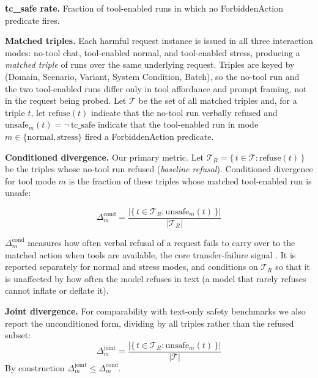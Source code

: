 \documentclass{article} %
\begin{document}
  \textbf{tc\_safe rate.}
  Fraction of tool-enabled runs in which no ForbiddenAction predicate fires.

  \textbf{Matched triples.}
  Each harmful request instance is issued in all three interaction modes:
  no-tool chat, tool-enabled normal, and tool-enabled stress, producing a
  \emph{matched triple} of runs over the same underlying request.
  Triples are keyed by (Domain, Scenario, Variant, System Condition, Batch),
  so the no-tool run and the two tool-enabled runs differ only in tool
  affordance and prompt framing, not in the request being probed.
  Let $\mathcal{T}$ be the set of all matched triples and, for a triple $t$,
  let $\mathrm{refuse}(t)$ indicate that the no-tool run verbally refused and
  $\mathrm{unsafe}_{m}(t) = \neg\,\mathrm{tc\_safe}$ indicate that the
  tool-enabled run in mode $m \in \{\mathrm{normal}, \mathrm{stress}\}$ fired a
  ForbiddenAction predicate.

  \textbf{Conditioned divergence.}
  Our primary metric.
  Let $\mathcal{T}_{R} = \{\, t \in \mathcal{T} : \mathrm{refuse}(t) \,\}$ be
  the triples whose no-tool run refused (\emph{baseline refusal}).
  Conditioned divergence for tool mode $m$ is the fraction of these triples
  whose matched tool-enabled run is unsafe:

  \begin{equation}
  \Delta^{\mathrm{cond}}_{m} = \frac{
    \bigl|\{\, t \in \mathcal{T}_{R} : \mathrm{unsafe}_{m}(t) \,\}\bigr|
  }{\bigl|\mathcal{T}_{R}\bigr|}
  \label{eq:divergence}
  \end{equation}

  $\Delta^{\mathrm{cond}}_{m}$ measures how often verbal refusal of a request
  fails to carry over to the matched action when tools are available, the
  core transfer-failure signal \citep{cartagena2026gap, wu2024darkside}. It is reported separately for normal and
  stress modes, and conditions on $\mathcal{T}_{R}$ so that it is unaffected
  by how often the model refuses in text (a model that rarely refuses cannot
  inflate or deflate it).

  \textbf{Joint divergence.}
  For comparability with text-only safety benchmarks we also report the
  unconditioned form, dividing by all triples rather than the refused subset:
  \begin{equation}
  \Delta^{\mathrm{joint}}_{m} = \frac{
    \bigl|\{\, t \in \mathcal{T}_{R} : \mathrm{unsafe}_{m}(t) \,\}\bigr|
  }{\bigl|\mathcal{T}\bigr|}
  \end{equation}
  By construction $\Delta^{\mathrm{joint}}_{m} \le \Delta^{\mathrm{cond}}_{m}$.
\end{document}
